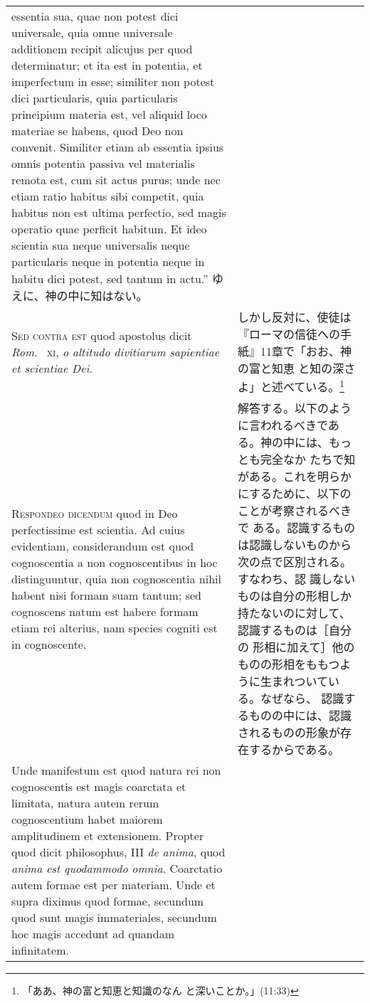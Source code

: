 \documentclass[10pt]{jsarticle} %
\begin{document}
\begin{longtable}{p{21em}p{21em}}
{ essentia sua, quae non potest dici universale, quia omne universale
 additionem recipit alicujus per quod determinatur; et ita est in
 potentia, et imperfectum in esse; similiter non potest dici
 particularis, quia particularis principium materia est, vel aliquid
 loco materiae se habens, quod Deo non convenit. Similiter etiam ab
 essentia ipsius omnis potentia passiva vel materialis remota est, cum
 sit actus purus; unde nec etiam ratio habitus sibi competit, quia
 habitus non est ultima perfectio, sed magis operatio quae perficit
 habitum. Et ideo scientia sua neque universalis neque particularis
 neque in potentia neque in habitu dici potest, sed tantum in actu.''
}
ゆえに、神の中に知はない。
\\



{\scshape Sed contra est} quod apostolus dicit {\itshape Rom}.~{\scshape
xi}, {\itshape o altitudo divitiarum sapientiae et scientiae Dei}.

&

しかし反対に、使徒は『ローマの信徒への手紙』11章で「おお、神の富と知恵
と知の深さよ」と述べている。\footnote{「ああ、神の富と知恵と知識のなん
と深いことか。」(11:33)}



\\



{\scshape Respondeo dicendum} quod in Deo perfectissime est scientia. Ad
cuius evidentiam, considerandum est quod cognoscentia a non
cognoscentibus in hoc distinguuntur, quia non cognoscentia nihil habent
nisi formam suam tantum; sed cognoscens natum est habere formam etiam
rei alterius, nam species cogniti est in cognoscente.

&


解答する。以下のように言われるべきである。神の中には、もっとも完全なか
たちで知がある。これを明らかにするために、以下のことが考察されるべきで
ある。認識するものは認識しないものから次の点で区別される。すなわち、認
識しないものは自分の形相しか持たないのに対して、認識するものは［自分の
形相に加えて］他のものの形相をももつように生まれついている。なぜなら、
認識するものの中には、認識されるものの形象が存在するからである。


\\


Unde manifestum est quod natura rei non cognoscentis est magis coarctata
et limitata, natura autem rerum cognoscentium habet maiorem amplitudinem
et extensionem. Propter quod dicit philosophus, III {\itshape de anima},
quod {\itshape anima est quodammodo omnia}. Coarctatio autem formae est
per materiam. Unde et supra diximus quod formae, secundum quod sunt
magis immateriales, secundum hoc magis accedunt ad quandam infinitatem.



\end{longtable}
\end{document}
